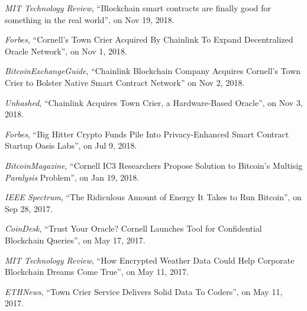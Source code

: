 \begin{loneinnerlist}
\item {\it MIT Technology Review}, ``Blockchain smart contracts are finally good for something in the real world'', on Nov 19, 2018.
\item {\it Forbes}, ``Cornell's Town Crier Acquired By Chainlink To Expand Decentralized Oracle Network'', on Nov 1, 2018.
\item {\it BitcoinExchangeGuide}, ``Chainlink Blockchain Company Acquires Cornell’s Town Crier to Bolster Native Smart Contract Network'' on Nov 2, 2018.
\item {\it Unhashed}, ``Chainlink Acquires Town Crier, a Hardware-Based Oracle'', on Nov 3, 2018.
\item {\it Forbes}, ``Big Hitter Crypto Funds Pile Into Privacy-Enhanced Smart Contract Startup Oasis Labs'', on Jul 9, 2018.
\item {\it BitcoinMagazine}, ``Cornell IC3 Researchers Propose Solution to Bitcoin's Multisig {\em Paralysis} Problem'', on Jan 19, 2018.
\item {\it IEEE Spectrum}, ``The Ridiculous Amount of Energy It Takes to Run Bitcoin'', on Sep 28, 2017.
\item {\it CoinDesk}, ``Trust Your Oracle? Cornell Launches Tool for Confidential Blockchain Queries'', on May 17, 2017.
\item {\it MIT Technology Review}, ``How Encrypted Weather Data Could Help Corporate Blockchain Dreams Come True'', on May 11, 2017.
\item {\it ETHNews}, ``Town Crier Service Delivers Solid Data To Coders'', on May 11, 2017.
\end{loneinnerlist}
